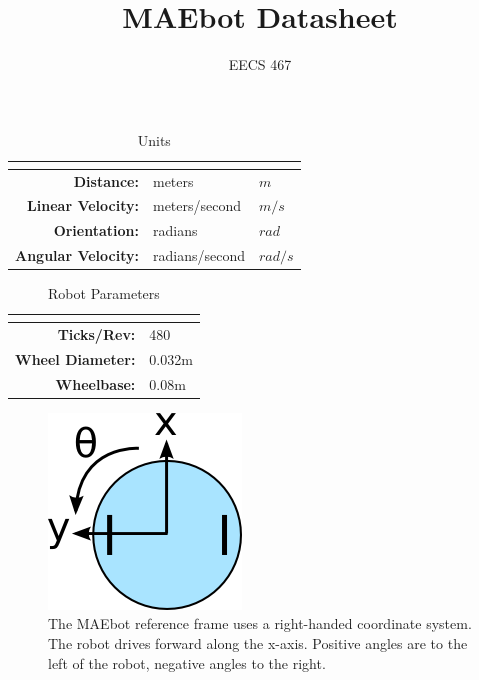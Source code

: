 \documentclass{article}
\title{MAEbot Datasheet}
\author{EECS 467}
\begin{document}
\maketitle

\begin{table}[h]
\caption{Units}
\centering
\begin{tabular}{| r | l  l |}
\multicolumn{2}{r}{} \\  %
\hline
\textbf{Distance:}         & meters         & $m$      \\
\hline
\textbf{Linear Velocity:}  & meters/second  & $m/s$    \\
\hline
\textbf{Orientation:}      & radians        & $rad$     \\
\hline
\textbf{Angular Velocity:} & radians/second & $rad/s$   \\
\hline
\end{tabular}
\end{table}

\begin{table}[h]
\caption{Robot Parameters}
\centering
\begin{tabular}{| r | l |}
\multicolumn{2}{r}{} \\  %
\hline
\textbf{Ticks/Rev:}       & 480     \\
\hline
\textbf{Wheel Diameter:}  & 0.032m  \\
\hline
\textbf{Wheelbase:}       & 0.08m   \\
\hline
\end{tabular}
\end{table}

\begin{figure}[h]
\begin{center}
 \includegraphics{./maebot_frame.png}
 \caption{The MAEbot reference frame uses a right-handed coordinate system. The robot drives forward along the x-axis. Positive angles are to the left of the robot, negative 
          angles to the right.}
\end{center}
\end{figure}
\end{document}
